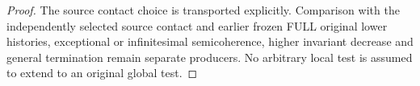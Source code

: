 \begin{proof}
The source contact choice is transported explicitly. Comparison with the
independently selected source contact and earlier frozen FULL original lower
histories, exceptional or infinitesimal semicoherence, higher invariant
decrease and general termination remain separate producers. No arbitrary
local test is assumed to extend to an original global test.
\end{proof}
